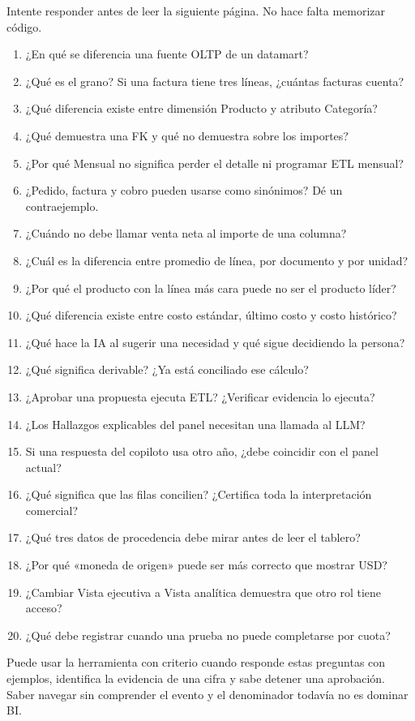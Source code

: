 Intente responder antes de leer la siguiente página. No hace falta memorizar código.
\begin{enumerate}
\item ¿En qué se diferencia una fuente OLTP de un datamart?
\item ¿Qué es el grano? Si una factura tiene tres líneas, ¿cuántas facturas cuenta?
\item ¿Qué diferencia existe entre dimensión Producto y atributo Categoría?
\item ¿Qué demuestra una FK y qué no demuestra sobre los importes?
\item ¿Por qué Mensual no significa perder el detalle ni programar ETL mensual?
\item ¿Pedido, factura y cobro pueden usarse como sinónimos? Dé un contraejemplo.
\item ¿Cuándo no debe llamar venta neta al importe de una columna?
\item ¿Cuál es la diferencia entre promedio de línea, por documento y por unidad?
\item ¿Por qué el producto con la línea más cara puede no ser el producto líder?
\item ¿Qué diferencia existe entre costo estándar, último costo y costo histórico?
\item ¿Qué hace la IA al sugerir una necesidad y qué sigue decidiendo la persona?
\item ¿Qué significa derivable? ¿Ya está conciliado ese cálculo?
\item ¿Aprobar una propuesta ejecuta ETL? ¿Verificar evidencia lo ejecuta?
\item ¿Los Hallazgos explicables del panel necesitan una llamada al LLM?
\item Si una respuesta del copiloto usa otro año, ¿debe coincidir con el panel actual?
\item ¿Qué significa que las filas concilien? ¿Certifica toda la interpretación comercial?
\item ¿Qué tres datos de procedencia debe mirar antes de leer el tablero?
\item ¿Por qué «moneda de origen» puede ser más correcto que mostrar USD?
\item ¿Cambiar Vista ejecutiva a Vista analítica demuestra que otro rol tiene acceso?
\item ¿Qué debe registrar cuando una prueba no puede completarse por cuota?
\end{enumerate}
\begin{good}
Puede usar la herramienta con criterio cuando responde estas preguntas con ejemplos, identifica la evidencia de una cifra y sabe detener una aprobación. Saber navegar sin comprender el evento y el denominador todavía no es dominar BI.
\end{good}

